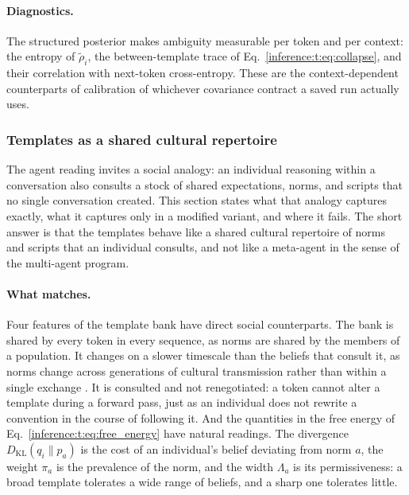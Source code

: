 \documentclass[11pt]{article}
\theoremstyle{definition}
\theoremstyle{remark}
\providecommand{\KL}{D_{\mathrm{KL}}}
\begin{document}
\paragraph{Diagnostics.}
The structured posterior makes ambiguity measurable per token and per context: the entropy of $\tilde\rho_i$, the between-template trace of Eq.~\eqref{inference:t:eq:collapse}, and their correlation with next-token cross-entropy. These are the context-dependent counterparts of calibration of whichever covariance contract a saved run actually uses.

\subsubsection{Templates as a shared cultural repertoire}
\label{inference:t:sec:social}

The agent reading invites a social analogy: an individual reasoning within a conversation also consults a stock of shared expectations, norms, and scripts that no single conversation created. This section states what that analogy captures exactly, what it captures only in a modified variant, and where it fails. The short answer is that the templates behave like a shared cultural repertoire of norms and scripts that an individual consults, and not like a meta-agent in the sense of the multi-agent program.

\paragraph{What matches.}
Four features of the template bank have direct social counterparts. The bank is shared by every token in every sequence, as norms are shared by the members of a population. It changes on a slower timescale than the beliefs that consult it, as norms change across generations of cultural transmission rather than within a single exchange \citep{inference:boyd1985}. It is consulted and not renegotiated: a token cannot alter a template during a forward pass, just as an individual does not rewrite a convention in the course of following it. And the quantities in the free energy of Eq.~\eqref{inference:t:eq:free_energy} have natural readings. The divergence $\KL(q_i\|p_a)$ is the cost of an individual's belief deviating from norm $a$, the weight $\pi_a$ is the prevalence of the norm, and the width $\Lambda_a$ is its permissiveness: a broad template tolerates a wide range of beliefs, and a sharp one tolerates little.
\end{document}
